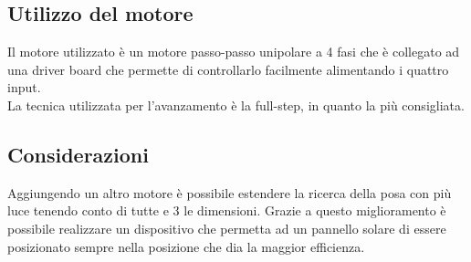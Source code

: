 \documentclass[12pt,oneside,a4paper]{article}
\begin{document}
\subsection{Utilizzo del motore}
Il motore utilizzato è un motore passo-passo unipolare a 4 fasi che è collegato ad una driver board che permette di controllarlo facilmente alimentando i quattro input.
\\La tecnica utilizzata per l'avanzamento è la full-step, in quanto la più consigliata.


\subsection{Considerazioni}
Aggiungendo un altro motore è possibile estendere la ricerca della posa con più luce tenendo conto di tutte e 3 le dimensioni.
Grazie a questo miglioramento è possibile realizzare un dispositivo che permetta ad un pannello solare di essere posizionato sempre nella posizione che dia la maggior efficienza.




\end{document}
